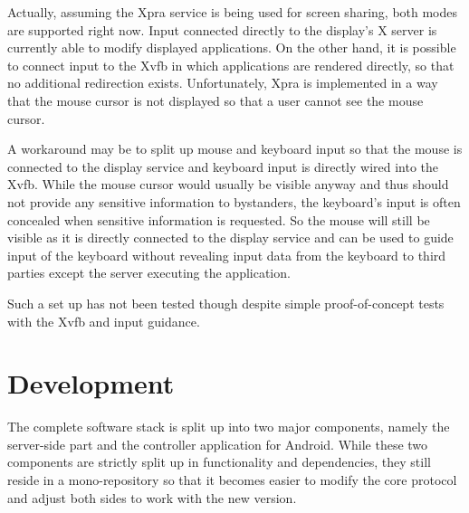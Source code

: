 Actually, assuming the Xpra service is being used for screen sharing, both modes are supported right now.
Input connected directly to the display's X server is currently able to modify displayed applications.
On the other hand, it is possible to connect input to the Xvfb in which applications are rendered directly, so that no additional redirection exists.
Unfortunately, Xpra is implemented in a way that the mouse cursor is not displayed so that a user cannot see the mouse cursor.

A workaround may be to split up mouse and keyboard input so that the mouse is connected to the display service and keyboard input is directly wired into the Xvfb.
While the mouse cursor would usually be visible anyway and thus should not provide any sensitive information to bystanders, the keyboard's input is often concealed when sensitive information is requested.
So the mouse will still be visible as it is directly connected to the display service and can be used to guide input of the keyboard without revealing input data from the keyboard to third parties except the server executing the application.

Such a set up has not been tested though despite simple proof-of-concept tests with the Xvfb and input guidance.

\section{Development}

The complete software stack is split up into two major components, namely the server-side part and the controller application for Android.
While these two components are strictly split up in functionality and dependencies, they still reside in a mono-repository so that it becomes easier to modify the core protocol and adjust both sides to work with the new version.

